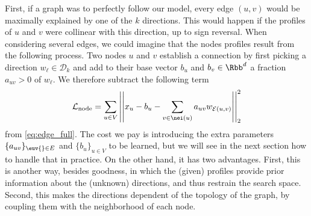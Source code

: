 First, if a graph was to perfectly follow our model, every edge $(u,v)$ would be maximally explained
by one of the $k$ directions. This would happen if the profiles of $u$ and $v$ were collinear with
this direction, up to sign reversal. When considering several edges, we could imagine that the nodes
profiles result from the following process. Two nodes $u$ and $v$ establish a connection by first
picking a direction $w_\ell \in \mathcal{D}_k$ and add to their base vector $b_u$ and $b_v \in
\Rbb^d$ a fraction $a_{uv} > 0$ of $w_\ell$. We therefore subtract the following term
\begin{equation}
  \label{eq:edge_node_loss}
  \mathcal{L}_{\mathrm{node}} =
  \sum_{u\in V} \left|\left| x_u - b_u -
  \sum_{v \in \nei(u)} a_{uv} w_{\mathcal{E}(u,v)} \right|\right|^2_2
\end{equation}
from \eqref{eq:edge_full}. The cost we pay is introducing the extra parameters $\{a_{uv}\}_{\euv{} \in
E}$ and $\{b_u\}_{u \in V}$ to be learned, but we will see in the next section how to handle that in
practice. On the other hand, it has two advantages. First, this is another way, besides goodness, in
which the (given) profiles provide prior information about the (unknown) directions, and thus
restrain the search space. Second, this makes the directions dependent of the topology of the graph,
by coupling them with the neighborhood of each node.

